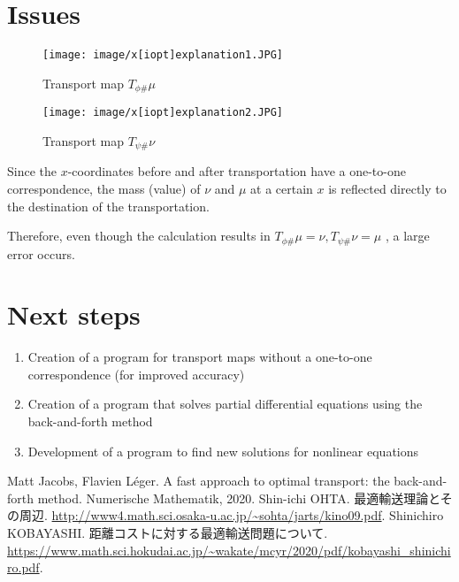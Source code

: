 \documentclass[a4j,10pt, twocolumn, dvipdfmx]{article}
\theoremstyle{definition}
\begin{document}
\section{Issues}

\begin{figure}[htbp]
    \begin{center}
        \texttt{[image: image/x[iopt]explanation1.JPG]}
        \caption{Transport map $T_{\phi \#} \mu$}
        \texttt{[image: image/x[iopt]explanation2.JPG]}
        \caption{Transport map $T_{\psi \#} \nu$}
    \end{center}
\end{figure}
\label{x[iopt]explanation}

Since the $x$-coordinates before and after transportation have a one-to-one correspondence, 
the mass (value) of $\nu$ and $\mu$ at a certain $x$ is reflected directly to the destination of the transportation.

Therefore, even though the calculation results in $T_{\phi \#} \mu = \nu, T_{\psi \#} \nu = \mu$ , a large error occurs.
\section{Next steps}
\begin{enumerate}
    \item Creation of a program for transport maps without a one-to-one correspondence (for improved accuracy)
    \item Creation of a program that solves partial differential equations using the back-and-forth method
    \item Development of a program to find new solutions for nonlinear equations
\end{enumerate}


\begin{thebibliography}{99}
    Matt Jacobs, Flavien Léger.
    \newblock A fast approach to optimal transport: the back-and-forth method.
    \newblock Numerische Mathematik, 2020. 
    Shin-ichi OHTA.
    \newblock 最適輸送理論とその周辺.
    \newblock \url{http://www4.math.sci.osaka-u.ac.jp/~sohta/jarts/kino09.pdf}.
    Shinichiro KOBAYASHI.
    \newblock 距離コストに対する最適輸送問題について.
    \newblock \url{https://www.math.sci.hokudai.ac.jp/~wakate/mcyr/2020/pdf/kobayashi_shinichiro.pdf}.

    \end{thebibliography}
\end{document}
